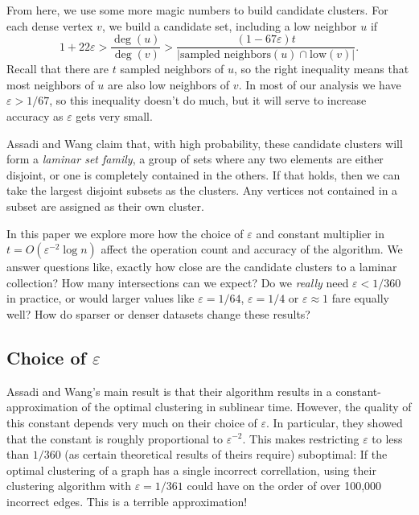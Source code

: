 \documentclass[
]{article}
\begin{document}
From here, we use some more magic numbers to build candidate clusters.
For each dense vertex {\(v\)}, we build a candidate set, including a low
neighbor {\(u\)} if
  {\[1 + 22\varepsilon > \frac{\deg(u)}{\deg(v)} > \frac{(1 - 67\varepsilon)t}{|\text{sampled\ neighbors}(u) \cap \text{low}(v)|}.\]}Recall
that there are {\(t\)} sampled neighbors of {\(u\)}, so the right
inequality means that most neighbors of {\(u\)} are also low neighbors
of {\(v\)}. In most of our analysis we have {\(\varepsilon > 1/67\)}, so
this inequality doesn't do much, but it will serve to
increase accuracy as {\(\varepsilon\)} gets very small.

Assadi and Wang claim that, with high probability, these candidate clusters will form a
\emph{laminar set family}, a group of sets where any two elements are either disjoint,
or one is completely contained in the others.
If that holds, then we can take the largest disjoint subsets as the clusters.
Any vertices not contained in a subset are assigned as their own cluster.

In this paper we explore more how the choice of {\(\varepsilon\)} and
constant multiplier in {\(t = O(\varepsilon^{- 2}\log n)\)} affect the
operation count and accuracy of the algorithm. We answer questions like,
exactly how close are the candidate clusters to a laminar collection?
How many intersections can we expect? Do we \emph{really} need
{\(\varepsilon < 1/360\)} in practice, or would larger values like
{\(\varepsilon = 1/64\)}, {\(\varepsilon = 1/4\)} or
{\(\varepsilon \approx 1\)} fare equally well? How do sparser or denser
datasets change these results?

\hypertarget{choice-of-varepsilon}{%
  \subsection{\texorpdfstring{Choice of
        {\(\varepsilon\)}}{Choice of \textbackslash varepsilon}}\label{choice-of-varepsilon}}

Assadi and Wang's main result is that their algorithm
results in a constant-approximation of the optimal clustering in
sublinear time. However, the quality of this constant depends very much
on their choice of {\(\varepsilon\)}. In particular, they showed that
the constant is roughly proportional to {\(\varepsilon^{- 2}\)}. This
makes restricting {\(\varepsilon\)} to less than {\(1/360\)} (as certain
theoretical results of theirs require) suboptimal: If the optimal
clustering of a graph has a single incorrect correllation, using their
clustering algorithm with {\(\varepsilon = 1/361\)} could have on the
order of over 100,000 incorrect edges. This is a terrible approximation!
\end{document}
